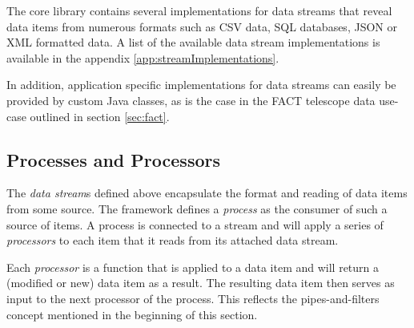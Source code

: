 The core \streams library contains several implementations for data
streams that reveal data items from numerous formats such as CSV data,
SQL databases, JSON or XML formatted data. A list of the available
data stream implementations is available in the appendix \ref{app:streamImplementations}.

In addition, application specific implementations for data streams can
easily be provided by custom Java classes, as is the case in the FACT
telescope data use-case outlined in section \ref{sec:fact}.

%


%
%

\subsection{\label{sec:basics}Processes and Processors}
The {\em data stream}s defined above encapsulate the format and reading
of data items from some source. The \streams framework defines a
{\em process} as the consumer of such a source of items. A process is
connected to a stream and will apply a series of {\em processors} to
each item that it reads from its attached data stream.

Each {\em processor} is a function that is applied to a data item and
will return a (modified or new) data item as a result. The resulting
data item then serves as input to the next processor of the
process. This reflects the pipes-and-filters concept mentioned in the
beginning of this section.


